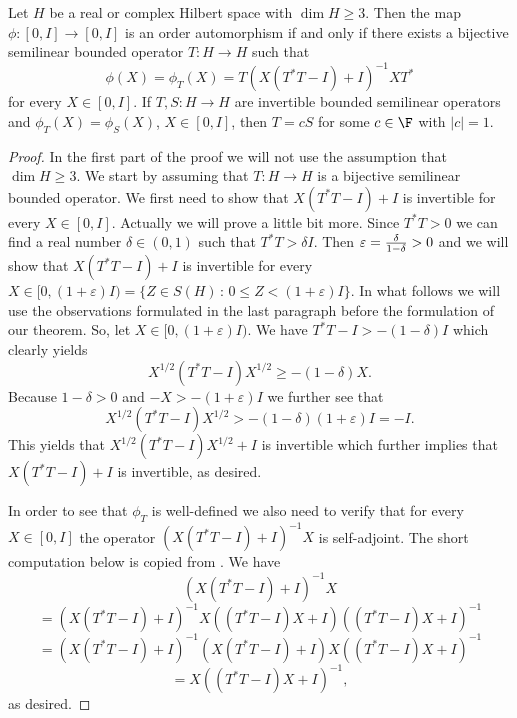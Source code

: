 \documentclass{article}
\begin{document}
\begin{theorem}\label{reacom} 
Let $H$ be a real or complex Hilbert space with $\dim H \ge 3$. Then the map $\phi : [0, I] \to [0, I]$ is an order automorphism if and only if
there exists a bijective semilinear bounded operator
$T: H\to H$ such that
$$
\phi (X) =  \phi_T(X) = T \left( X (T^\ast T -I) +I \right)^{-1} X T^\ast
$$
for every
$X \in [0,I]$.
If $T, S : H \to H$ are invertible bounded semilinear operators and $\phi_T (X) = \phi_S (X)$, $X \in [0,I]$, then $T = cS$ for some $c \in \F$ with $|c | =1$.
\end{theorem}

\begin{proof}
In the first part of the proof we will not use the assumption that $\dim H \ge 3$.
We start by assuming that $T : H \to H$ is a bijective semilinear bounded operator. We first need to show that $X (T^\ast T -I) +I$ is invertible for every $X \in [0,I]$. 
Actually we will prove a little bit more. Since $T^\ast T > 0$ we can find a real number $\delta \in (0,1)$ such that $T^\ast T > \delta I$. Then $\varepsilon = {\delta \over 1 - \delta} > 0$ and we will show 
 that $X (T^\ast T -I) +I$ is invertible for every $X \in [0,(1+\varepsilon)I) = \{ Z \in S(H) \, : \, 0 \le Z < (1+\varepsilon)I \}$.
In what follows we will use the observations formulated in the last paragraph before the formulation of our theorem. So, let $X \in [0,(1+\varepsilon) I)$. We have $T^\ast T - I  > - (1- \delta)I$ which clearly yields
$$
X^{1/2} (  T^\ast T - I ) X^{1/2} \ge  -(1-  \delta) X. 
$$
Because $1 - \delta >0$ and $-X > -(1 + \varepsilon)I$ we further see that
$$
X^{1/2} (  T^\ast T - I ) X^{1/2} > -(1-  \delta) (1 + \varepsilon) I = -I. 
$$
This yields that $X^{1/2} (  T^\ast T - I ) X^{1/2} + I$ is invertible which further implies that $X (T^\ast T -I) +I$ is invertible, as desired.

In order to see that $\phi_T$ is well-defined we also need to verify that  for every $X \in [0 ,I]$ the operator $(X (  T^\ast T - I ) + I)^{-1} X$ is self-adjoint. The short computation below is copied from \cite{MS}. We have
 $$
 (X (  T^\ast T - I )+I)^{-1}X $$ $$
= (X (  T^\ast T - I )+I)^{-1}X( (  T^\ast T - I )X+I)( (  T^\ast T - I )X+I)^{-1}$$
$$= (X (  T^\ast T - I )+I)^{-1}(X (  T^\ast T - I )+I)X( (  T^\ast T - I )X+I)^{-1} $$ $$
=X( (  T^\ast T - I )X+I)^{-1},
$$
as desired.


\end{proof}
\end{document}
